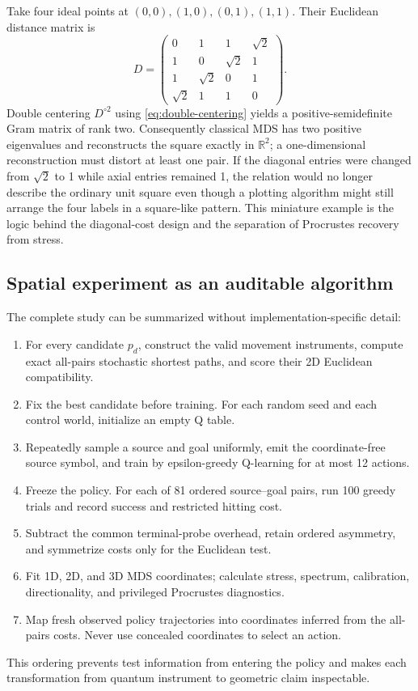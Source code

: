 \documentclass[11pt]{article}
\newcommand{\R}{\mathbb R}
\begin{document}
Take four ideal points at $(0,0),(1,0),(0,1),(1,1)$. Their Euclidean distance
matrix is
\begin{equation}
 D=\begin{pmatrix}
 0&1&1&\sqrt2\\
 1&0&\sqrt2&1\\
 1&\sqrt2&0&1\\
 \sqrt2&1&1&0
 \end{pmatrix}.
\end{equation}
Double centering $D^{\circ2}$ using \cref{eq:double-centering} yields a
positive-semidefinite Gram matrix of rank two. Consequently classical MDS has
two positive eigenvalues and reconstructs the square exactly in $\R^2$; a
one-dimensional reconstruction must distort at least one pair. If the
diagonal entries were changed from $\sqrt2$ to 1 while axial entries remained
1, the relation would no longer describe the ordinary unit square even though
a plotting algorithm might still arrange the four labels in a square-like
pattern. This miniature example is the logic behind the diagonal-cost design
and the separation of Procrustes recovery from stress.

\subsection{Spatial experiment as an auditable algorithm}

The complete study can be summarized without implementation-specific detail:
\begin{enumerate}
 \item For every candidate $p_d$, construct the valid movement instruments,
 compute exact all-pairs stochastic shortest paths, and score their 2D
 Euclidean compatibility.
 \item Fix the best candidate before training. For each random seed and each
 control world, initialize an empty Q table.
 \item Repeatedly sample a source and goal uniformly, emit the coordinate-free
 source symbol, and train by epsilon-greedy Q-learning for at most 12 actions.
 \item Freeze the policy. For each of 81 ordered source--goal pairs, run 100
 greedy trials and record success and restricted hitting cost.
 \item Subtract the common terminal-probe overhead, retain ordered asymmetry,
 and symmetrize costs only for the Euclidean test.
 \item Fit 1D, 2D, and 3D MDS coordinates; calculate stress, spectrum,
 calibration, directionality, and privileged Procrustes diagnostics.
 \item Map fresh observed policy trajectories into coordinates inferred from
 the all-pairs costs. Never use concealed coordinates to select an action.
\end{enumerate}
This ordering prevents test information from entering the policy and makes
each transformation from quantum instrument to geometric claim inspectable.
\end{document}
